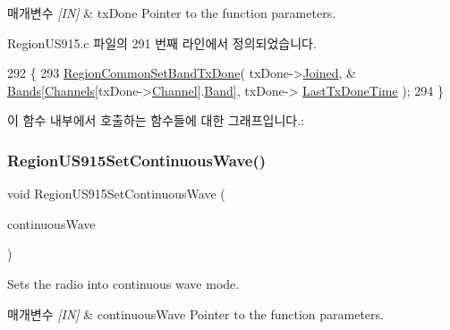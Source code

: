 \begin{DoxyParams}{매개변수}
{\em \mbox{[}\+I\+N\mbox{]}} & tx\+Done Pointer to the function parameters. \\
\hline
\end{DoxyParams}


Region\+U\+S915.\+c 파일의 291 번째 라인에서 정의되었습니다.


\begin{DoxyCode}
292 \{
293     \mbox{\hyperlink{group___r_e_g_i_o_n_c_o_m_m_o_n_ga491dea5590228a0cd33affd71743779c}{RegionCommonSetBandTxDone}}( txDone->\mbox{\hyperlink{structs_set_band_tx_done_params_ac2f6caa0f3b02d2ac5056c3ee7c22652}{Joined}}, &
      \mbox{\hyperlink{_region_u_s915_8c_a04e3e1a4af677cf4f4b64c1335e07dd0}{Bands}}[\mbox{\hyperlink{_region_u_s915_8c_a83f8d040b2c69b3b4ed9ff970b0efcfb}{Channels}}[txDone->\mbox{\hyperlink{structs_set_band_tx_done_params_a1ca6f01ca18afe402de51babe8c95f5e}{Channel}}].\mbox{\hyperlink{structs_channel_params_a724c03aa06953111c3291243831f251b}{Band}}], txDone->
      \mbox{\hyperlink{structs_set_band_tx_done_params_a7316dfb002c4e0015fceeb727020fe5c}{LastTxDoneTime}} );
294 \}
\end{DoxyCode}
이 함수 내부에서 호출하는 함수들에 대한 그래프입니다.\+:
\mbox{\label{group___r_e_g_i_o_n_u_s915_gaa87cec170f4c2f1a257f8228b7dd321f}} 
\subsubsection{\texorpdfstring{Region\+U\+S915\+Set\+Continuous\+Wave()}{RegionUS915SetContinuousWave()}}
{\footnotesize\ttfamily void Region\+U\+S915\+Set\+Continuous\+Wave (\begin{DoxyParamCaption}\item[{\mbox{\hyperlink{group___r_e_g_i_o_n_gaf39bb5ba06921139c6d17f88a8d518cd}{Continuous\+Wave\+Params\+\_\+t}} $\ast$}]{continuous\+Wave }\end{DoxyParamCaption})}



Sets the radio into continuous wave mode. 


\begin{DoxyParams}{매개변수}
{\em \mbox{[}\+I\+N\mbox{]}} & continuous\+Wave Pointer to the function parameters. \\
\hline
\end{DoxyParams}


